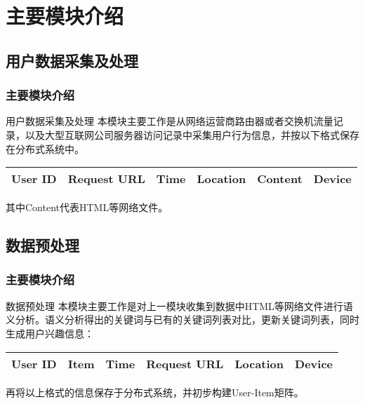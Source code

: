 \documentclass{beamer}
\begin{document}
\begin{frame}
\begin{center}
\end{center}
\end{frame}


\section{主要模块介绍}
\subsection{用户数据采集及处理}
\begin{frame}
	\frametitle{主要模块介绍}
		\begin{block}{用户数据采集及处理}
		本模块主要工作是从网络运营商路由器或者交换机流量记录，以及大型互联网公司服务器访问记录中采集用户行为信息，并按以下格式保存在分布式系统中。
		\begin{center}
		\begin{tabular}{c|c|c|c|c|c}
	\hline
	User ID & Request URL & Time & Location & Content & Device \\
	\hline
\end{tabular}
\end{center}
其中Content代表HTML等网络文件。
		\end{block}
\end{frame}

\subsection{数据预处理}
\begin{frame}
	\frametitle{主要模块介绍}
		\begin{block}{数据预处理}
		本模块主要工作是对上一模块收集到数据中HTML等网络文件进行语义分析。语义分析得出的关键词与已有的关键词列表对比，更新关键词列表，同时生成用户兴趣信息：
		\begin{center}
\begin{tabular}{c|c|c|c|c|c}
	\hline
	User ID & Item & Time & Request URL & Location & Device \\
	\hline
\end{tabular}
\end{center}
		再将以上格式的信息保存于分布式系统，并初步构建User-Item矩阵。
		\end{block}
\end{frame}
\end{document}
